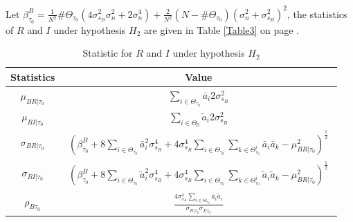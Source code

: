 Let $\beta_{\tau_0}^B = \frac{1}{N^2}\#\Theta_{\tau_0}(4\sigma_{s_B}^2\sigma_n^2+2\sigma_n^4) + \frac{2}{N^2}(N - \#\Theta_{\tau_0})(\sigma_n^2+\sigma_{s_B}^2)^2$, 
the statistics of $R$ and $I$ under hypothesis $H_2$ are given in Table \ref{Table3} on page \pageref{Table3}. 
\begin{table}[h]
\centering
  \begin{tabular}{|c|c|}
	\hline
	Statistics          & Value                                                                                                                                                                                                                 \\ \hline
	$\mu_{BR|\tau_0}$    & $\displaystyle{\sum_{i\in\Theta_{\tau_0}}\bar{a}_i2\sigma_{s_B}^2}$                                                                                                                                                                      \\ \hline
	$\mu_{BI|\tau_0}$    & $\displaystyle{\sum_{i\in\Theta_0}\tilde{a}_i2\sigma_{s_B}^2}$                                                                                                                                                                           \\ \hline
    $\sigma_{BR|\tau_0}$ & $\displaystyle{\left(\beta_{\tau_0}^B+8\sum_{i\in\Theta_{\tau_0}}\bar{a}_i^2\sigma_{s_B}^4 + 4\sigma_{s_B}^4\sum_{i\in\Theta_{\tau_0}}\sum_{k\in\Theta_{\tau_0}^i}\bar{a}_i\bar{a}_k- \mu_{BR|\tau_0}^2 \right)^\frac{1}{2}}$  \\ \hline
    $\sigma_{BI|\tau_0}$ & 
    $\begin{array} {l} \displaystyle{\left(\beta_{\tau_0}^B +8\sum_{i\in\Theta_{\tau_0}}\tilde{a}_i^2\sigma_{s_B}^4 +4\sigma_{s_B}^4\sum_{i\in\Theta_{\tau_0}}\sum_{k\in\Theta_{\tau_0}^i}\tilde{a}_i\tilde{a}_k- \mu_{BR|\tau_0}^2\right)^\frac{1}{2}}\end{array}$ 
    \\ \hline
	$\rho_{B\tau_0}$    & $ \displaystyle{\frac{4\sigma_{s_A}^4\sum_{i\in\Theta_{\tau_0}}\bar{a}_i\tilde{a}_i}{\sigma_{R|\tau_0}\sigma_{I|\tau_0}}}$                                                                            \\ \hline
  \end{tabular}
  \caption{Statistic for $R$ and $I$ under hypothesis $H_2$}
  \label{Table2}
\end{table}

